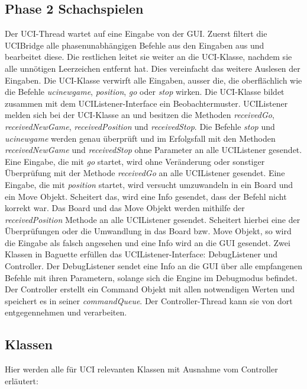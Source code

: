 \subsection{Phase 2 Schachspielen}\label{subsec:phase-2-schachspielen}
Der UCI-Thread wartet auf eine Eingabe von der GUI\@.
Zuerst filtert die UCIBridge alle phasenunabh\"angigen Befehle aus den Eingaben aus und bearbeitet diese.
Die restlichen leitet sie weiter an die UCI-Klasse, nachdem sie alle unn\"otigen Leerzeichen entfernt hat.
Dies vereinfacht das weitere Auslesen der Eingaben.
Die UCI-Klasse verwirft alle Eingaben, ausser die, die oberfl\"achlich wie die Befehle \textit{ucinewgame}, \textit{position},
\textit{go} oder \textit{stop} wirken.
\newline
Die UCI-Klasse bildet zusammen mit dem UCIListener-Interface ein Beobachtermuster.
UCIListener melden sich bei der UCI-Klasse an und besitzen die Methoden \textit{receivedGo}, \textit{receivedNewGame},
\textit{receivedPosition} und \textit{receivedStop}.
\newline
Die Befehle \textit{stop} und \textit{ucinewgame} werden genau \"uberpr\"uft und im Erfolgsfall mit den Methoden
\textit{receivedNewGame} und \textit{receivedStop} ohne Parameter an alle UCIListener gesendet.
Eine Eingabe, die mit \textit{go} startet, wird ohne Ver\"anderung oder sonstiger \"Uberpr\"ufung mit der Methode
\textit{receivedGo} an alle UCIListener gesendet.
Eine Eingabe, die mit \textit{position} startet, wird versucht umzuwandeln in ein Board und ein Move
Objekt.
Scheitert das, wird eine Info gesendet, dass der Befehl nicht korrekt war.
Das Board und das Move Objekt werden mithilfe der \textit{receivedPosition} Methode an alle UCIListener
gesendet.
\newline
Scheitert hierbei eine der \"Uberpr\"ufungen oder die Umwandlung in das Board bzw. Move Objekt,
so wird die Eingabe als falsch angesehen und eine Info wird an die GUI gesendet.
\newline
Zwei Klassen in Baguette erf\"ullen das UCIListener-Interface: DebugListener und Controller.
Der DebugListener sendet eine Info an die GUI \"uber alle empfangenen Befehle mit ihren Parametern, solange sich die
Engine im Debugmodus befindet.
\newline
Der Controller erstellt ein Command Objekt mit allen notwendigen Werten und speichert es in seiner
\textit{commandQueue}.
Der Controller-Thread kann sie von dort entgegennehmen und verarbeiten.
\newline \newline
\subsection{Klassen}\label{subsec:klassen}
Hier werden alle f\"ur UCI relevanten Klassen mit Ausnahme vom Controller erl\"autert:
